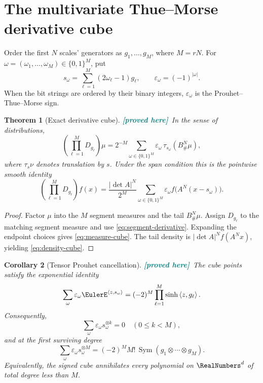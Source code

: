 \documentclass[11pt,oneside]{article}
\newtheorem{theorem}{Theorem}[section]
\newtheorem{corollary}[theorem]{Corollary}
\theoremstyle{definition}
\theoremstyle{remark}
\newcommand{\Sym}{\operatorname{Sym}}
\newcommand{\ip}[2]{\left\langle #1,#2\right\rangle}
\newcommand{\New}{\textcolor{teal}{\textbf{[proved here]}}}
\begin{document}
\section{The multivariate Thue--Morse derivative cube}
\label{sec:thue-morse}

Order the first $N$ scales' generators as
$g_1,\ldots,g_M$, where $M=rN$.  For
$\omega=(\omega_1,\ldots,\omega_M)\in\{0,1\}^M$, put
\begin{equation}
 s_\omega=\sum_{\ell=1}^M(2\omega_\ell-1)g_\ell,
 \qquad \varepsilon_\omega=(-1)^{|\omega|}.
 \label{eq:cube-points}
\end{equation}
When the bit strings are ordered by their binary integers, $\varepsilon_\omega$
is the Prouhet--Thue--Morse sign.

\begin{theorem}[Exact derivative cube]
\label{thm:derivative-cube}
\New\ In the sense of distributions,
\begin{equation}
 \left(\prod_{\ell=1}^M D_{g_\ell}\right)\mu
 =2^{-M}\sum_{\omega\in\{0,1\}^M}
   \varepsilon_\omega\,\tau_{s_\omega}(B^N_\#\mu),
 \label{eq:measure-cube}
\end{equation}
where $\tau_s\nu$ denotes translation by $s$.  Under the span condition this is
the pointwise smooth identity
\begin{equation}
 \left(\prod_{\ell=1}^M D_{g_\ell}\right)f(x)
 =\frac{|\det A|^N}{2^M}
  \sum_{\omega\in\{0,1\}^M}\varepsilon_\omega
  f\bigl(A^N(x-s_\omega)\bigr).
 \label{eq:density-cube}
\end{equation}
\end{theorem}

\begin{proof}
Factor $\mu$ into the $M$ segment measures and the tail $B^N_\#\mu$.  Assign
$D_{g_\ell}$ to the matching segment measure and use
\eqref{eq:segment-derivative}.  Expanding the endpoint choices gives
\eqref{eq:measure-cube}.  The tail density is
$|\det A|^Nf(A^Nx)$, yielding \eqref{eq:density-cube}.
\end{proof}

\begin{corollary}[Tensor Prouhet cancellation]
\label{cor:tensor-prouhet}
\New\ The cube points satisfy the exponential identity
\begin{equation}
 \sum_{\omega}\varepsilon_\omega\EulerE^{\ip{z}{s_\omega}}
 =(-2)^M\prod_{\ell=1}^M\sinh\ip{z}{g_\ell}.
 \label{eq:exponential-prouhet}
\end{equation}
Consequently,
\begin{equation}
 \sum_\omega\varepsilon_\omega s_\omega^{\otimes k}=0
 \quad(0\le k<M),
 \label{eq:tensor-vanishing}
\end{equation}
and at the first surviving degree
\begin{equation}
 \sum_\omega\varepsilon_\omega s_\omega^{\otimes M}
 =(-2)^MM!\,\Sym(g_1\otimes\cdots\otimes g_M).
 \label{eq:first-tensor}
\end{equation}
Equivalently, the signed cube annihilates every polynomial on $\RealNumbers^d$ of total
degree less than $M$.
\end{corollary}
\end{document}
